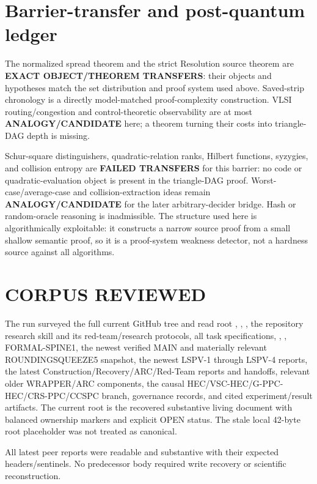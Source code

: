 \documentclass[11pt]{article}
\begin{document}
\section{Barrier-transfer and post-quantum ledger}
The normalized spread theorem and the strict Resolution source theorem are
\textbf{EXACT OBJECT/THEOREM TRANSFERS}: their objects and hypotheses match
the set distribution and proof system used above.  Saved-strip chronology
is a directly model-matched proof-complexity construction.  VLSI
routing/congestion and control-theoretic observability are at most
\textbf{ANALOGY/CANDIDATE} here; a theorem turning their costs into
triangle-DAG depth is missing.

Schur-square distinguishers, quadratic-relation ranks, Hilbert functions,
syzygies, and collision entropy are \textbf{FAILED TRANSFERS} for this
barrier: no code or quadratic-evaluation object is present in the
triangle-DAG proof.  Worst-case/average-case and collision-extraction ideas
remain \textbf{ANALOGY/CANDIDATE} for the later arbitrary-decider bridge.
Hash or random-oracle reasoning is inadmissible.  The structure used here is
algorithmically exploitable: it constructs a narrow source proof from a
small shallow semantic proof, so it is a proof-system weakness detector,
not a hardness source against all algorithms.

\section{CORPUS REVIEWED}
The run surveyed the full current GitHub tree and read root
, , , the repository research
skill and its red-team/research protocols, all task specifications,
, , FORMAL-SPINE1, the newest verified MAIN
and materially relevant ROUNDINGSQUEEZE5 snapshot, the newest LSPV-1 through
LSPV-4 reports, the latest Construction/Recovery/ARC/Red-Team reports and
handoffs, relevant older WRAPPER/ARC components, the causal
HEC/VSC-HEC/G-PPC-HEC/CRS-PPC/CCSPC branch, governance records, and cited
experiment/result artifacts.  The current root is the recovered substantive
living document with balanced ownership markers and explicit OPEN status.
The stale local 42-byte root placeholder was not treated as canonical.

All latest peer reports were readable and substantive with their expected
headers/sentinels.  No predecessor body required write recovery or
scientific reconstruction.
\end{document}
